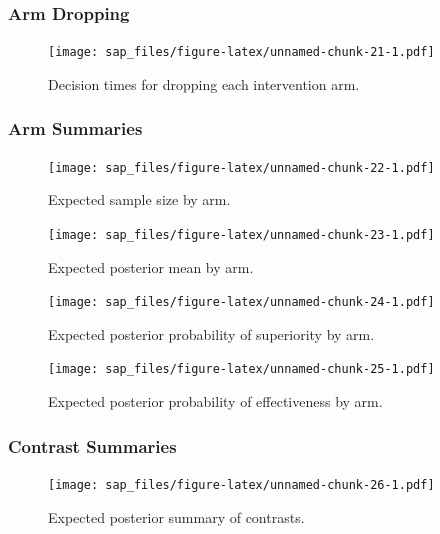 \documentclass[
  bibliography=totoc]{scrreprt}
\begin{document}
\hypertarget{arm-dropping-1}{%
\subsubsection{Arm Dropping}\label{arm-dropping-1}}

\begin{figure}
\centering
\texttt{[image: sap\_files/figure-latex/unnamed-chunk-21-1.pdf]}
\caption{\label{fig:unnamed-chunk-21}Decision times for dropping each intervention arm.}
\end{figure}

\clearpage

\hypertarget{arm-summaries-1}{%
\subsubsection{Arm Summaries}\label{arm-summaries-1}}

\begin{figure}
\centering
\texttt{[image: sap\_files/figure-latex/unnamed-chunk-22-1.pdf]}
\caption{\label{fig:unnamed-chunk-22}Expected sample size by arm.}
\end{figure}

\begin{figure}
\centering
\texttt{[image: sap\_files/figure-latex/unnamed-chunk-23-1.pdf]}
\caption{\label{fig:unnamed-chunk-23}Expected posterior mean by arm.}
\end{figure}

\begin{figure}
\centering
\texttt{[image: sap\_files/figure-latex/unnamed-chunk-24-1.pdf]}
\caption{\label{fig:unnamed-chunk-24}Expected posterior probability of superiority by arm.}
\end{figure}

\begin{figure}
\centering
\texttt{[image: sap\_files/figure-latex/unnamed-chunk-25-1.pdf]}
\caption{\label{fig:unnamed-chunk-25}Expected posterior probability of effectiveness by arm.}
\end{figure}

\clearpage

\hypertarget{contrast-summaries-1}{%
\subsubsection{Contrast Summaries}\label{contrast-summaries-1}}

\begin{figure}
\centering
\texttt{[image: sap\_files/figure-latex/unnamed-chunk-26-1.pdf]}
\caption{\label{fig:unnamed-chunk-26}Expected posterior summary of contrasts.}
\end{figure}
\end{document}
